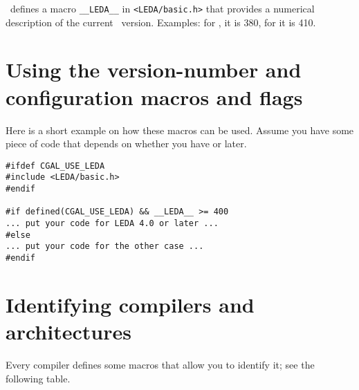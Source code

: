 \noindent \leda\ defines a macro \texttt{\_\_LEDA\_\_}
in
\texttt{<LEDA/basic.h>} that provides a numerical description of the
current \leda\ version. Examples: for , it is 380, for
 it is 410.

\section{Using the version-number and configuration macros and flags}
\label{sec:using_version_macros}

Here is a short example on how these macros can be used. Assume you have some
piece of code that depends on whether you have  or later.
\begin{verbatim}
#ifdef CGAL_USE_LEDA
#include <LEDA/basic.h>
#endif

#if defined(CGAL_USE_LEDA) && __LEDA__ >= 400
... put your code for LEDA 4.0 or later ...
#else
... put your code for the other case ...
#endif 
\end{verbatim}

\section{Identifying compilers and architectures}
\label{sec:which_compiler}

Every compiler defines some macros that allow you to identify it; see 
the following table.

\vspace{5mm}\vspace{5mm}

